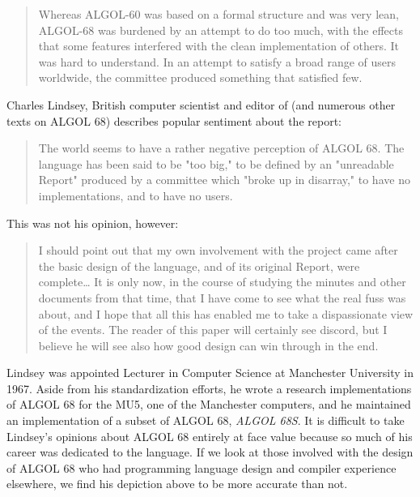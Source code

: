 \begin{quotation}
	Whereas ALGOL-60 was based on a formal structure
	and was very lean, ALGOL-68 was burdened by an attempt to do too
	much, with the effects that some features interfered with the clean
	implementation of others. It was hard to understand. In an attempt to
	satisfy a broad range of users worldwide, the committee produced
	something that satisfied few.
\end{quotation}

Charles Lindsey, British computer scientist and editor of
(and numerous other texts on ALGOL 68) describes popular sentiment about the
report\cite{a_history_of_algol_68_1993}:
\begin{quotation}
	The world seems to have a rather negative perception of ALGOL 68. The language has been said to
	be "too big," to be defined by an "unreadable Report" produced by a committee which "broke up in
	disarray," to have no implementations, and to have no users.
\end{quotation}

This was not his opinion, however\cite{a_history_of_algol_68_1993}:

\begin{quotation}
	I should point out that my own involvement with the project came after the basic design of the
	language, and of its original Report, were complete\dots
	It is only now, in the course of studying the minutes and other
	documents from that time, that I have come to see what the real fuss was about, and I hope that all
	this has enabled me to take a dispassionate view of the events. The reader of this paper will certainly
	see discord, but I believe he will see also how good design can win through in the end.
\end{quotation}

Lindsey was appointed Lecturer in Computer Science at Manchester University
in 1967. Aside from his standardization efforts, he wrote a research implementations of
ALGOL 68 for the MU5, one of the Manchester computers, and he maintained an
implementation of a subset of ALGOL 68, \textit{ALGOL 68S}.
It is difficult to take Lindsey's opinions about ALGOL 68 entirely at face
value because so much of his career was dedicated to the language.
If we look at those involved with the design of ALGOL 68 who
had programming language design and compiler experience elsewhere,
we find his depiction above to be more accurate than not.

